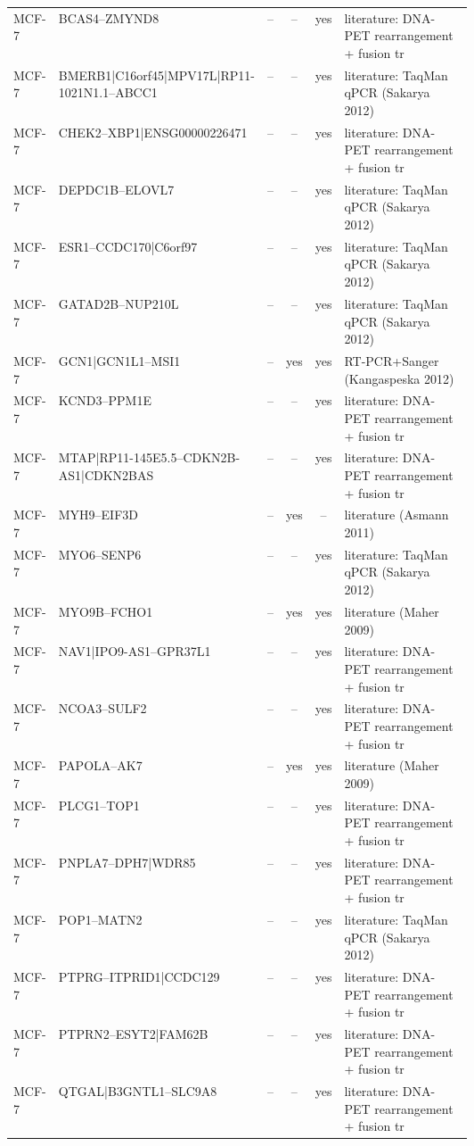 {\begin{longtable}{lp{0.30\linewidth}cccp{0.30\linewidth}}
MCF-7 & BCAS4--ZMYND8 & -- & -- & yes & literature: DNA-PET rearrangement + fusion tr \\
MCF-7 & BMERB1|C16orf45|MPV17L|RP11-1021N1.1--ABCC1 & -- & -- & yes & literature: TaqMan qPCR (Sakarya 2012) \\
MCF-7 & CHEK2--XBP1|ENSG00000226471 & -- & -- & yes & literature: DNA-PET rearrangement + fusion tr \\
MCF-7 & DEPDC1B--ELOVL7 & -- & -- & yes & literature: TaqMan qPCR (Sakarya 2012) \\
MCF-7 & ESR1--CCDC170|C6orf97 & -- & -- & yes & literature: TaqMan qPCR (Sakarya 2012) \\
MCF-7 & GATAD2B--NUP210L & -- & -- & yes & literature: TaqMan qPCR (Sakarya 2012) \\
MCF-7 & GCN1|GCN1L1--MSI1 & -- & yes & yes & RT-PCR+Sanger (Kangaspeska 2012) \\
MCF-7 & KCND3--PPM1E & -- & -- & yes & literature: DNA-PET rearrangement + fusion tr \\
MCF-7 & MTAP|RP11-145E5.5--CDKN2B-AS1|CDKN2BAS & -- & -- & yes & literature: DNA-PET rearrangement + fusion tr \\
MCF-7 & MYH9--EIF3D & -- & yes & -- & literature (Asmann 2011) \\
MCF-7 & MYO6--SENP6 & -- & -- & yes & literature: TaqMan qPCR (Sakarya 2012) \\
MCF-7 & MYO9B--FCHO1 & -- & yes & yes & literature (Maher 2009) \\
MCF-7 & NAV1|IPO9-AS1--GPR37L1 & -- & -- & yes & literature: DNA-PET rearrangement + fusion tr \\
MCF-7 & NCOA3--SULF2 & -- & -- & yes & literature: DNA-PET rearrangement + fusion tr \\
MCF-7 & PAPOLA--AK7 & -- & yes & yes & literature (Maher 2009) \\
MCF-7 & PLCG1--TOP1 & -- & -- & yes & literature: DNA-PET rearrangement + fusion tr \\
MCF-7 & PNPLA7--DPH7|WDR85 & -- & -- & yes & literature: DNA-PET rearrangement + fusion tr \\
MCF-7 & POP1--MATN2 & -- & -- & yes & literature: TaqMan qPCR (Sakarya 2012) \\
MCF-7 & PTPRG--ITPRID1|CCDC129 & -- & -- & yes & literature: DNA-PET rearrangement + fusion tr \\
MCF-7 & PTPRN2--ESYT2|FAM62B & -- & -- & yes & literature: DNA-PET rearrangement + fusion tr \\
MCF-7 & QTGAL|B3GNTL1--SLC9A8 & -- & -- & yes & literature: DNA-PET rearrangement + fusion tr \\

\end{longtable}}
